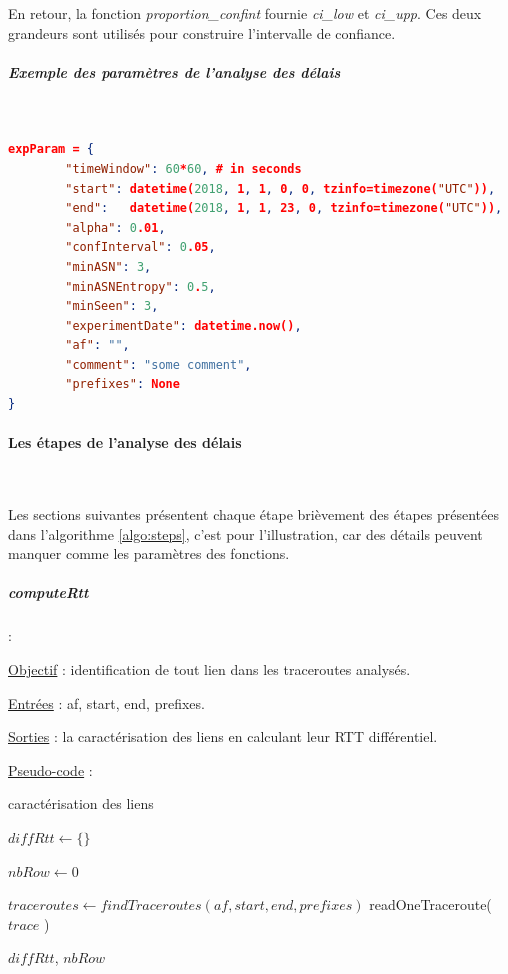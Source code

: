 En retour, la fonction \textit{proportion\_confint}  fournie \textit{ci\_low} et \textit{ci\_upp}. Ces deux grandeurs sont utilisés pour construire l'intervalle de confiance.


\subparagraph{Exemple des  paramètres de l'analyse des délais}~

\begin{lstlisting}[language=json,firstnumber=1,basicstyle=\tiny]
expParam = {
    	"timeWindow": 60*60, # in seconds 
    	"start": datetime(2018, 1, 1, 0, 0, tzinfo=timezone("UTC")), 
    	"end":   datetime(2018, 1, 1, 23, 0, tzinfo=timezone("UTC")),
    	"alpha": 0.01, 
    	"confInterval": 0.05,
    	"minASN": 3,
    	"minASNEntropy": 0.5,
    	"minSeen": 3,
    	"experimentDate": datetime.now(),
    	"af": "",
    	"comment": "some comment",
    	"prefixes": None
}
  \end{lstlisting}
   
   
  \paragraph{Les étapes de l'analyse des délais}~
  
  Les sections suivantes présentent chaque étape brièvement des étapes présentées dans l'algorithme 	\ref{algo:steps}, c'est pour l'illustration, car des détails peuvent manquer comme les paramètres des fonctions.
  \subparagraph{computeRtt} :
  
    \underline{Objectif} : identification de tout  lien dans les traceroutes analysés.
    
    \underline{Entrées} : af, start, end,  prefixes.
    
    \underline{Sorties} : la caractérisation des liens en calculant leur RTT différentiel.  

    \underline{Pseudo-code} : 
    
      \begin{algorithm}
      	\caption{caractérisation des liens }
      	\begin{algorithmic}[1]
      		
      		\State $ diffRtt  \leftarrow   \{\} $
      		
      		\State $nbRow \leftarrow 0 $
      		
	  		\State $ traceroutes  \leftarrow  findTraceroutes(af, start, end, prefixes) $
		  		\State readOneTraceroute( $trace$ )
	  		\EndFor
	  		
	        \Return $ diffRtt $, $ nbRow $
      		\EndFunction
      	\end{algorithmic}

      	\label{algo:step-computeRtt}
      \end{algorithm}
      
